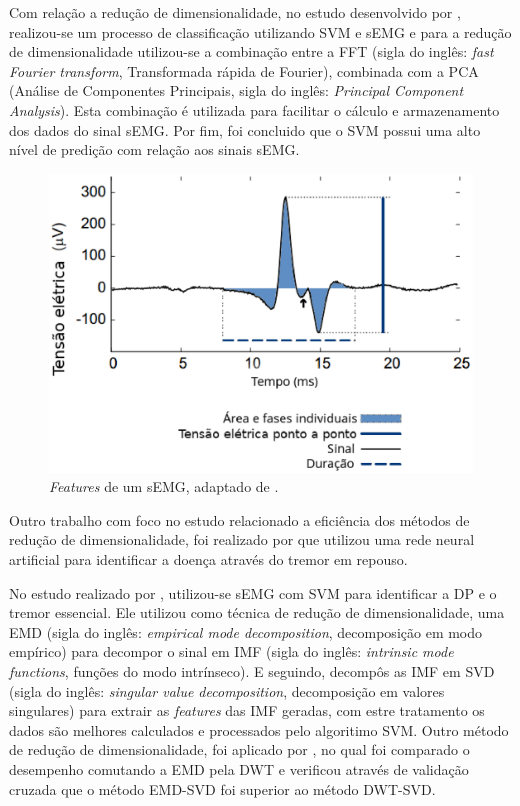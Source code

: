 Com relação a redução de dimensionalidade, no estudo desenvolvido por , realizou-se um processo de classificação utilizando SVM e sEMG e para a redução de dimensionalidade utilizou-se a combinação entre a FFT (sigla do inglês: \textit{fast Fourier transform}, Transformada rápida de Fourier), combinada com a PCA (Análise de Componentes Principais, sigla do inglês: \textit{Principal Component Analysis}). Esta combinação é utilizada para facilitar o cálculo e armazenamento dos dados do sinal sEMG. Por fim,  foi concluido que o SVM possui uma alto nível de predição com relação aos sinais sEMG.

\begin{figure}[h]
    \centering
     \includegraphics[width=1\textwidth]{figuras/featuresEMG.eps}
     \caption{\textit{Features} de um sEMG, adaptado de .}
     \label{featuresEMG}
 \end{figure}

Outro trabalho com foco no estudo relacionado a eficiência dos métodos de redução de dimensionalidade, foi realizado por  que utilizou uma rede neural artificial para identificar a doença através do tremor em repouso. 

No estudo realizado por , utilizou-se sEMG com SVM para identificar a DP e o tremor essencial. Ele utilizou como técnica de redução de dimensionalidade, uma EMD (sigla do inglês: \textit{empirical mode decomposition}, decomposição em modo empírico) para decompor o sinal em IMF (sigla do inglês: \textit{intrinsic mode functions}, funções do modo intrínseco). E seguindo, decompôs as IMF em SVD (sigla do inglês: \textit{singular value decomposition}, decomposição em valores singulares) para extrair as \textit{features} das IMF geradas, com estre tratamento os dados são melhores calculados e processados pelo algoritimo SVM. Outro método de redução de dimensionalidade, foi aplicado por , no qual foi comparado o desempenho comutando a EMD pela DWT e verificou através de validação cruzada que o método EMD-SVD foi superior ao método DWT-SVD.

